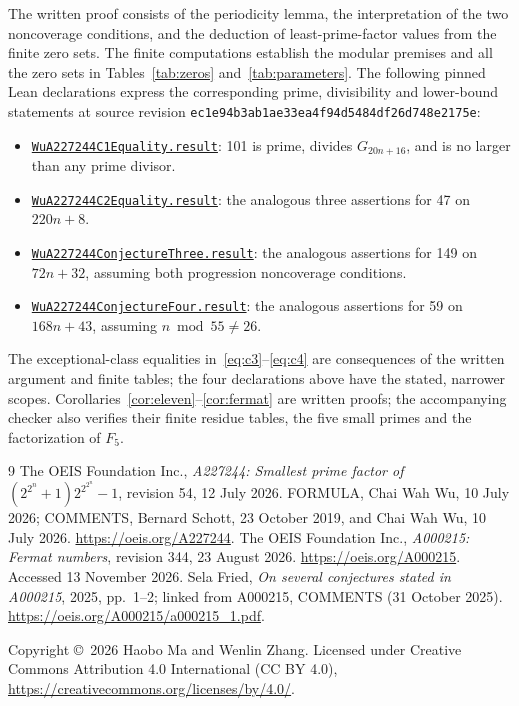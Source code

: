 \documentclass[11pt]{article}
\begin{document}
The written proof consists of the periodicity lemma, the interpretation of
the two noncoverage conditions, and the deduction of least-prime-factor values
from the finite zero sets. The finite computations establish the modular
premises and all the zero sets in Tables~\ref{tab:zeros} and~\ref{tab:parameters}.
The following pinned Lean declarations express the corresponding prime,
divisibility and lower-bound statements at source revision
\texttt{ec1e94b3ab1ae33ea4f94d5484df26d748e2175e}:
\begin{itemize}
\item \href{https://github.com/the-omega-institute/trureturing/blob/ec1e94b3ab1ae33ea4f94d5484df26d748e2175e/D5/S3/Arith/Congruence/WuA227244C1Equality.lean}{\texttt{WuA227244C1Equality.result}}:
101 is prime, divides $G_{20n+16}$, and is no larger than any prime divisor.
\item \href{https://github.com/the-omega-institute/trureturing/blob/ec1e94b3ab1ae33ea4f94d5484df26d748e2175e/D5/S3/Arith/Congruence/WuA227244C2Equality.lean}{\texttt{WuA227244C2Equality.result}}:
the analogous three assertions for 47 on $220n+8$.
\item \href{https://github.com/the-omega-institute/trureturing/blob/ec1e94b3ab1ae33ea4f94d5484df26d748e2175e/D5/S3/Arith/Primes/WuA227244ConjectureThree.lean}{\texttt{WuA227244ConjectureThree.result}}:
the analogous assertions for 149 on $72n+32$, assuming both progression
noncoverage conditions.
\item \href{https://github.com/the-omega-institute/trureturing/blob/ec1e94b3ab1ae33ea4f94d5484df26d748e2175e/D5/S3/Arith/Primes/WuA227244ConjectureFour.lean}{\texttt{WuA227244ConjectureFour.result}}:
the analogous assertions for 59 on $168n+43$, assuming $n\bmod55\ne26$.
\end{itemize}
The exceptional-class equalities in~\eqref{eq:c3}--\eqref{eq:c4} are consequences
of the written argument and finite tables; the four declarations above have
the stated, narrower scopes. Corollaries~\ref{cor:eleven}--\ref{cor:fermat}
are written proofs; the accompanying checker also verifies their finite
residue tables, the five small primes and the factorization of $F_5$.

\begin{thebibliography}{9}
The OEIS Foundation Inc., \emph{A227244: Smallest prime factor of
$(2^{2^n}+1)2^{2^{2^n}}-1$}, revision 54, 12 July 2026.
FORMULA, Chai Wah Wu, 10 July 2026; COMMENTS, Bernard Schott, 23 October 2019,
and Chai Wah Wu, 10 July 2026.
\url{https://oeis.org/A227244}.
The OEIS Foundation Inc., \emph{A000215: Fermat numbers},
revision 344, 23 August 2026.
\url{https://oeis.org/A000215}. Accessed 13 November 2026.
Sela Fried, \emph{On several conjectures stated in A000215}, 2025,
pp.~1--2; linked from A000215, COMMENTS (31 October 2025).
\url{https://oeis.org/A000215/a000215_1.pdf}.
\end{thebibliography}
\noindent\small Copyright \copyright\ 2026 Haobo Ma and Wenlin Zhang.
Licensed under Creative Commons Attribution 4.0 International (CC BY 4.0),
\url{https://creativecommons.org/licenses/by/4.0/}.
\end{document}
